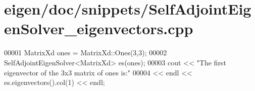 \hypertarget{eigen_2doc_2snippets_2_self_adjoint_eigen_solver__eigenvectors_8cpp_source}{}\section{eigen/doc/snippets/\+Self\+Adjoint\+Eigen\+Solver\+\_\+eigenvectors.cpp}
\label{eigen_2doc_2snippets_2_self_adjoint_eigen_solver__eigenvectors_8cpp_source}

\begin{DoxyCode}
00001 MatrixXd ones = MatrixXd::Ones(3,3);
00002 SelfAdjointEigenSolver<MatrixXd> es(ones);
00003 cout << \textcolor{stringliteral}{"The first eigenvector of the 3x3 matrix of ones is:"} 
00004      << endl << es.eigenvectors().col(1) << endl;
\end{DoxyCode}
